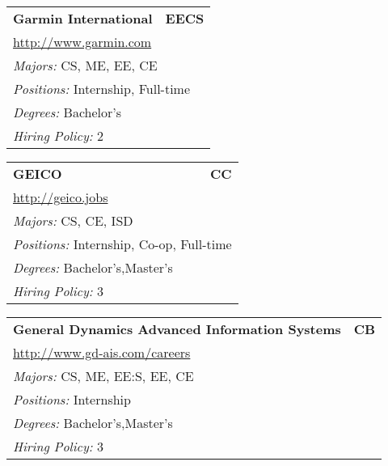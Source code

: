 \documentclass[twoside]{article}
\begin{document}
\begin{center}
\begin{multicols}{3}
\begin{FlushLeft}
\begin{minipage}{\columnwidth}
\end{minipage}
 
\begin{minipage}{\columnwidth}\begin{tabularx}{.95\columnwidth}{Xr}
                 {\Large\bf Garmin International} & {\Large\bf EECS}\\
    \multicolumn{2}{p{.95\columnwidth}}{\url{http://www.garmin.com}}\\
    \multicolumn{2}{p{.95\columnwidth}}{\emph{Majors:} CS, ME, EE, CE}\\
    \multicolumn{2}{p{.95\columnwidth}}{\emph{Positions:} Internship, Full-time}\\
    \multicolumn{2}{p{.95\columnwidth}}{\emph{Degrees:} Bachelor's}\\
    \multicolumn{2}{p{.95\columnwidth}}{\emph{Hiring Policy:} 2}\\
    \end{tabularx}
    
\end{minipage}
 
\begin{minipage}{\columnwidth}\begin{tabularx}{.95\columnwidth}{Xr}
                 {\Large\bf GEICO} & {\Large\bf CC}\\
    \multicolumn{2}{p{.95\columnwidth}}{\url{http://geico.jobs}}\\
    \multicolumn{2}{p{.95\columnwidth}}{\emph{Majors:} CS, CE, ISD}\\
    \multicolumn{2}{p{.95\columnwidth}}{\emph{Positions:} Internship, Co-op, Full-time}\\
    \multicolumn{2}{p{.95\columnwidth}}{\emph{Degrees:} Bachelor's,Master's}\\
    \multicolumn{2}{p{.95\columnwidth}}{\emph{Hiring Policy:} 3}\\
    \end{tabularx}
    
\end{minipage}
 
\begin{minipage}{\columnwidth}\begin{tabularx}{.95\columnwidth}{Xr}
                 {\Large\bf General Dynamics Advanced Information Systems} & {\Large\bf CB}\\
    \multicolumn{2}{p{.95\columnwidth}}{\url{http://www.gd-ais.com/careers}}\\
    \multicolumn{2}{p{.95\columnwidth}}{\emph{Majors:} CS, ME, EE:S, EE, CE}\\
    \multicolumn{2}{p{.95\columnwidth}}{\emph{Positions:} Internship}\\
    \multicolumn{2}{p{.95\columnwidth}}{\emph{Degrees:} Bachelor's,Master's}\\
    \multicolumn{2}{p{.95\columnwidth}}{\emph{Hiring Policy:} 3}\\
    \end{tabularx}
    

\end{minipage}
\end{FlushLeft}
\end{multicols}
\end{center}
\end{document}
